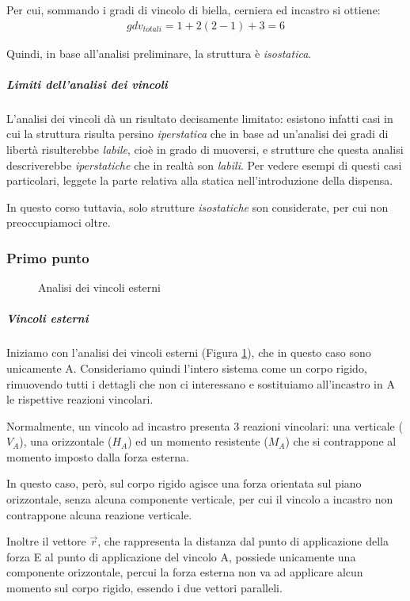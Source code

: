 \documentclass[main.tex]{subfiles}
\begin{document}
Per cui, sommando i gradi di vincolo di biella, cerniera ed incastro si ottiene:
\begin{gather*}
gdv_{totali}= 1 + 2(2-1) + 3 = 6
\end{gather*}

Quindi, in base all'analisi preliminare, la struttura è \textit{isostatica}.

\subparagraph{Limiti dell'analisi dei vincoli} L'analisi dei vincoli dà un risultato decisamente limitato: esistono infatti casi in cui la struttura risulta persino \textit{iperstatica} che in base ad un'analisi dei gradi di libertà risulterebbe \textit{labile}, cioè in grado di muoversi, e strutture che questa analisi descriverebbe \textit{iperstatiche} che in realtà son \textit{labili}.
Per vedere esempi di questi casi particolari, leggete la parte relativa alla statica nell'introduzione della dispensa.

In questo corso tuttavia, solo strutture \textit{isostatiche} son considerate, per cui non preoccupiamoci oltre.

\subsubsection{Primo punto}

\begin{figure}[htb]
\centering
\resizebox{.5\textwidth}{!}{}
\caption{Analisi dei vincoli esterni}
\label{vincoli_esterni_1}
\end{figure}

\subparagraph{Vincoli esterni}
Iniziamo con l'analisi dei vincoli esterni (Figura \ref{vincoli_esterni_1}), che in questo caso sono unicamente A. Consideriamo quindi l'intero sistema come un corpo rigido, rimuovendo tutti i dettagli che non ci interessano e sostituiamo all'incastro in A le rispettive reazioni vincolari.

Normalmente, un vincolo ad incastro presenta 3 reazioni vincolari: una verticale ($V_A$), una orizzontale ($H_A$) ed un momento resistente ($M_A$) che si contrappone al momento imposto dalla forza esterna.

In questo caso, però, sul corpo rigido agisce una forza orientata sul piano orizzontale, senza alcuna componente verticale, per cui il vincolo a incastro non contrappone alcuna reazione verticale.

Inoltre il vettore $\vec{r}$, che rappresenta la distanza dal punto di applicazione della forza E al punto di applicazione del vincolo A, possiede unicamente una componente orizzontale, percui la forza esterna non va ad applicare alcun momento sul corpo rigido, essendo i due vettori paralleli.
\end{document}
